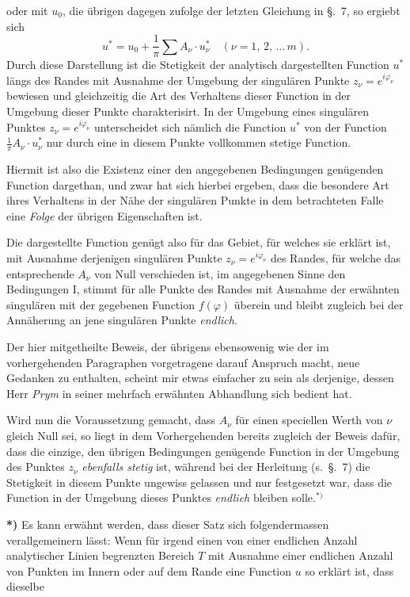 \documentclass{article}
\begin{document}
oder mit $u_0$, die übrigen dagegen zufolge der letzten Gleichung in §.~7, so ergiebt sich
\[
u^* = u_0 + \frac{1}{\pi} \sum A_\nu \cdot u_\nu^* \quad (\nu = 1, \, 2, \, \dots \, m).
\]
Durch diese Darstellung ist die Stetigkeit der analytisch dargestellten Function $u^*$ längs des Randes mit Ausnahme der Umgebung der singulären Punkte $z_\nu = e^{i\varphi_\nu}$ bewiesen und gleichzeitig die Art des Verhaltens dieser Function in der Umgebung dieser Punkte charakterisirt. In der Umgebung eines singulären Punktes $z_\nu = e^{i\varphi_\nu}$ unterscheidet sich nämlich die Function $u^*$ von der Function $\frac{1}{\pi} A_\nu \cdot u_\nu^*$ nur durch eine in diesem Punkte vollkommen stetige Function.

Hiermit ist also die Existenz einer den angegebenen Bedingungen genügenden Function dargethan, und zwar hat sich hierbei ergeben, dass die besondere Art ihres Verhaltens in der Nähe der singulären Punkte in dem betrachteten Falle eine \emph{Folge} der übrigen Eigenschaften ist.

Die dargestellte Function genügt also für das Gebiet, für welches sie erklärt ist, mit Ausnahme derjenigen singulären Punkte $z_\nu = e^{i\varphi_\nu}$ des Randes, für welche das entsprechende $A_\nu$ von Null verschieden ist, im angegebenen Sinne den Bedingungen I, stimmt für alle Punkte des Randes mit Ausnahme der erwähnten singulären mit der gegebenen Function $f(\varphi)$ überein und bleibt zugleich bei der Annäherung an jene singulären Punkte \emph{endlich}.

Der hier mitgetheilte Beweis, der übrigens ebensowenig wie der im vorhergehenden Paragraphen vorgetragene darauf Anspruch macht, neue Gedanken zu enthalten, scheint mir etwas einfacher zu sein als derjenige, dessen Herr \emph{Prym} in seiner mehrfach erwähnten Abhandlung sich bedient hat.

Wird nun die Voraussetzung gemacht, dass $A_\nu$ für einen speciellen Werth von $\nu$ gleich Null sei, so liegt in dem Vorhergehenden bereits zugleich der Beweis dafür, dass die einzige, den übrigen Bedingungen genügende Function in der Umgebung des Punktes $z_\nu$ \emph{ebenfalls stetig} ist, während bei der Herleitung (s.~§.~7) die Stetigkeit in diesem Punkte ungewiss gelassen und nur festgesetzt war, dass die Function in der Umgebung dieses Punktes \emph{endlich} bleiben solle.${}^{*)}$

\textbf{*)} Es kann erwähnt werden, dass dieser Satz sich folgendermassen verallgemeinern lässt: Wenn für irgend einen von einer endlichen Anzahl analytischer Linien begrenzten Bereich $T$ mit Ausnahme einer endlichen Anzahl von Punkten im Innern oder auf dem Rande eine Function $u$ so erklärt ist, dass dieselbe
\end{document}
